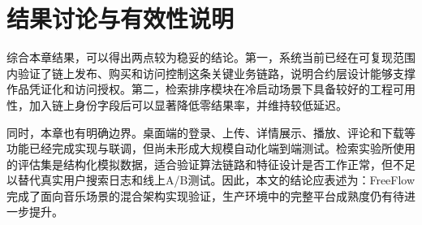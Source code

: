 \section{结果讨论与有效性说明}

综合本章结果，可以得出两点较为稳妥的结论。第一，系统当前已经在可复现范围内验证了链上发布、购买和访问控制这条关键业务链路，说明合约层设计能够支撑作品凭证化和访问授权。第二，检索排序模块在冷启动场景下具备较好的工程可用性，加入链上身份字段后可以显著降低零结果率，并维持较低延迟。

同时，本章也有明确边界。桌面端的登录、上传、详情展示、播放、评论和下载等功能已经完成实现与联调，但尚未形成大规模自动化端到端测试。检索实验所使用的评估集是结构化模拟数据，适合验证算法链路和特征设计是否工作正常，但不足以替代真实用户搜索日志和线上A/B测试。因此，本文的结论应表述为：FreeFlow完成了面向音乐场景的混合架构实现验证，生产环境中的完整平台成熟度仍有待进一步提升。


